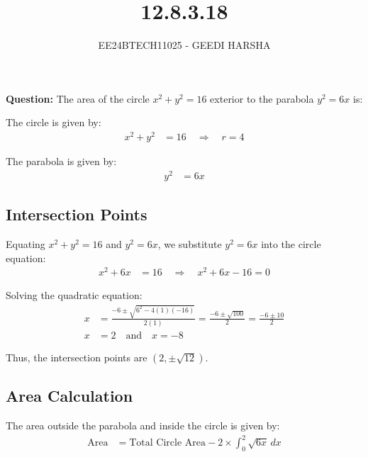 \documentclass[journal]{IEEEtran}
\begin{document}

\vspace{3cm}
\title{12.8.3.18}
\author{EE24BTECH11025 - GEEDI HARSHA}
{\let\newpage\relax\maketitle}

\renewcommand{\thefigure}{\theenumi}
\renewcommand{\thetable}{\theenumi}
\setlength{\intextsep}{10pt} %


\renewcommand{\thetable}{\theenumi}

\textbf{Question:}
The area of the circle \(x^2 + y^2 = 16\) exterior to the parabola \(y^2 = 6x\) is:


\solution

The circle is given by:
\begin{align*}
x^2 + y^2 &= 16 \quad \Rightarrow \quad r = 4
\end{align*}

The parabola is given by:
\begin{align*}
y^2 &= 6x
\end{align*}
\subsection*{Intersection Points}
Equating \(x^2 + y^2 = 16\) and \(y^2 = 6x\), we substitute \(y^2 = 6x\) into the circle equation:
\begin{align*}
x^2 + 6x &= 16 \quad \Rightarrow \quad x^2 + 6x - 16 = 0
\end{align*}

Solving the quadratic equation:
\begin{align*}
x &= \frac{-6 \pm \sqrt{6^2 - 4(1)(-16)}}{2(1)} = \frac{-6 \pm \sqrt{100}}{2} = \frac{-6 \pm 10}{2} \\
x &= 2 \quad \text{and} \quad x = -8
\end{align*}

Thus, the intersection points are \((2, \pm \sqrt{12})\).

\subsection*{Area Calculation}
The area outside the parabola and inside the circle is given by:
\begin{align*}
\text{Area} &= \text{Total Circle Area} - 2 \times \int_0^2 \sqrt{6x} \, dx
\end{align*}
\end{document}
